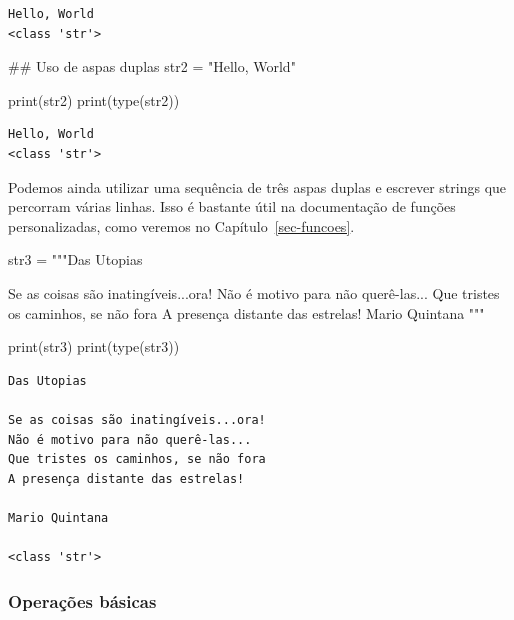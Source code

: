 \documentclass[
  brazilian,
  letterpaper,
  DIV=11,
  numbers=noendperiod]{scrreprt}
\newenvironment{Shaded}{\begin{snugshade}}{\end{snugshade}}
\newcommand{\BuiltInTok}[1]{\textcolor[rgb]{0.00,0.23,0.31}{#1}}
\newcommand{\CommentTok}[1]{\textcolor[rgb]{0.37,0.37,0.37}{#1}}
\newcommand{\NormalTok}[1]{\textcolor[rgb]{0.00,0.23,0.31}{#1}}
\newcommand{\OperatorTok}[1]{\textcolor[rgb]{0.37,0.37,0.37}{#1}}
\newcommand{\StringTok}[1]{\textcolor[rgb]{0.13,0.47,0.30}{#1}}
\begin{document}
\begin{verbatim}
Hello, World
<class 'str'>
\end{verbatim}

\begin{Shaded}
\begin{Highlighting}[]
\CommentTok{\#\# Uso de aspas duplas}
\NormalTok{str2 }\OperatorTok{=} \StringTok{"Hello, World"}

\BuiltInTok{print}\NormalTok{(str2)}
\BuiltInTok{print}\NormalTok{(}\BuiltInTok{type}\NormalTok{(str2))}
\end{Highlighting}
\end{Shaded}

\begin{verbatim}
Hello, World
<class 'str'>
\end{verbatim}

Podemos ainda utilizar uma sequência de três aspas duplas e escrever
strings que percorram várias linhas. Isso é bastante útil na
documentação de funções personalizadas, como veremos no
Capítulo~\ref{sec-funcoes}.

\begin{Shaded}
\begin{Highlighting}[]
\NormalTok{str3 }\OperatorTok{=} \StringTok{"""Das Utopias}

\StringTok{Se as coisas são inatingíveis...ora!}
\StringTok{Não é motivo para não querê{-}las...}
\StringTok{Que tristes os caminhos, se não fora}
\StringTok{A presença distante das estrelas!}
\StringTok{           }
\StringTok{Mario Quintana }
\StringTok{"""}

\BuiltInTok{print}\NormalTok{(str3)}
\BuiltInTok{print}\NormalTok{(}\BuiltInTok{type}\NormalTok{(str3))}
\end{Highlighting}
\end{Shaded}

\begin{verbatim}
Das Utopias

Se as coisas são inatingíveis...ora!
Não é motivo para não querê-las...
Que tristes os caminhos, se não fora
A presença distante das estrelas!

Mario Quintana 

<class 'str'>
\end{verbatim}

\subsubsection{Operações básicas}\label{operauxe7uxf5es-buxe1sicas}
\end{document}
